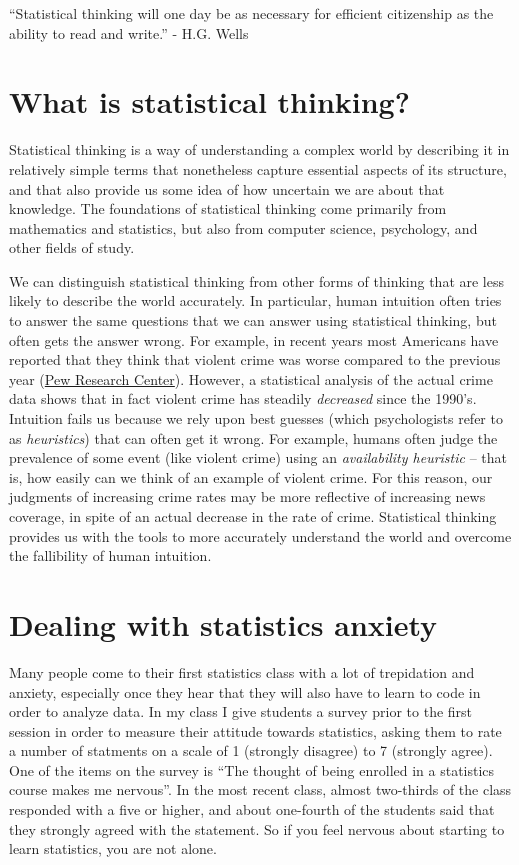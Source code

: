 \documentclass[12pt,]{book}
\theoremstyle{definition}
\theoremstyle{definition}
\theoremstyle{definition}
\theoremstyle{remark}
\begin{document}
``Statistical thinking will one day be as necessary for efficient citizenship as the ability to read and write.'' - H.G. Wells

\hypertarget{what-is-statistical-thinking}{%
\section{What is statistical thinking?}\label{what-is-statistical-thinking}}

Statistical thinking is a way of understanding a complex world by describing it in relatively simple terms that nonetheless capture essential aspects of its structure, and that also provide us some idea of how uncertain we are about that knowledge. The foundations of statistical thinking come primarily from mathematics and statistics, but also from computer science, psychology, and other fields of study.

We can distinguish statistical thinking from other forms of thinking that are less likely to describe the world accurately. In particular, human intuition often tries to answer the same questions that we can answer using statistical thinking, but often gets the answer wrong. For example, in recent years most Americans have reported that they think that violent crime was worse compared to the previous year (\href{http://www.pewresearch.org/fact-tank/2018/01/30/5-facts-about-crime-in-the-u-s/}{Pew Research Center}). However, a statistical analysis of the actual crime data shows that in fact violent crime has steadily \emph{decreased} since the 1990's. Intuition fails us because we rely upon best guesses (which psychologists refer to as \emph{heuristics}) that can often get it wrong. For example, humans often judge the prevalence of some event (like violent crime) using an \emph{availability heuristic} -- that is, how easily can we think of an example of violent crime. For this reason, our judgments of increasing crime rates may be more reflective of increasing news coverage, in spite of an actual decrease in the rate of crime. Statistical thinking provides us with the tools to more accurately understand the world and overcome the fallibility of human intuition.

\hypertarget{dealing-with-statistics-anxiety}{%
\section{Dealing with statistics anxiety}\label{dealing-with-statistics-anxiety}}

Many people come to their first statistics class with a lot of trepidation and anxiety, especially once they hear that they will also have to learn to code in order to analyze data. In my class I give students a survey prior to the first session in order to measure their attitude towards statistics, asking them to rate a number of statments on a scale of 1 (strongly disagree) to 7 (strongly agree). One of the items on the survey is ``The thought of being enrolled in a statistics course makes me nervous''. In the most recent class, almost two-thirds of the class responded with a five or higher, and about one-fourth of the students said that they strongly agreed with the statement. So if you feel nervous about starting to learn statistics, you are not alone.
\end{document}
